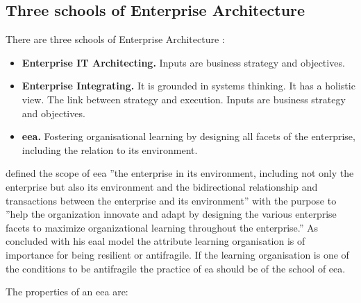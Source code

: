 \subsection{Three schools of Enterprise Architecture}
\label{sub:eathreeschools}
There are three schools of Enterprise Architecture \parencite{Lapalme2012}:
\begin{itemize}
	\item{\textbf{Enterprise IT Architecting.} Inputs are business strategy and objectives.}
	\item{\textbf{Enterprise Integrating.} It is grounded in systems thinking. It has a holistic view. The link between strategy and execution. Inputs are business strategy and objectives.}
	\item{\textbf{\acrfull{eea}.} Fostering organisational learning by designing all facets of the enterprise, including the relation to its environment.}
\end{itemize}

 \textcite{Lapalme2012} defined the scope of \acrshort{eea} ''the enterprise in its environment, including not only the enterprise but also its environment and the bidirectional relationship and transactions between the enterprise and its environment'' with the purpose to ''help the organization innovate and adapt by designing the various enterprise facets to maximize organizational learning throughout the enterprise.'' As \textcite{Botjes2020} concluded with his \acrshort{eaal} model the attribute learning organisation is of importance for being \gls{resilient} or \gls{antifragile}. If the learning organisation is one of the conditions to be \gls{antifragile} the practice of \acrshort{ea} should be of the school of \acrshort{eea}. 

The properties of an \acrshort{eea} are:

